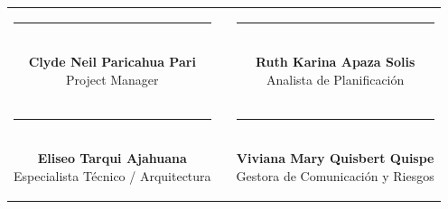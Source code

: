 \documentclass[11pt,a4paper]{article}
\begin{document}
\begin{center}
\begin{tabular}{c c c}
    \parbox{6.5cm}{\centering \rule{6.0cm}{0.6pt}\\[5pt] \textbf{Clyde Neil Paricahua Pari}\\[2pt] {\footnotesize Project Manager}} 
    & \hspace{0.8cm} &
    \parbox{6.5cm}{\centering \rule{6.0cm}{0.6pt}\\[5pt] \textbf{Ruth Karina Apaza Solis}\\[2pt] {\footnotesize Analista de Planificación}} 
    \\[2.2cm]
    \parbox{6.5cm}{\centering \rule{6.0cm}{0.6pt}\\[5pt] \textbf{Eliseo Tarqui Ajahuana}\\[2pt] {\footnotesize Especialista Técnico / Arquitectura}} 
    & \hspace{0.8cm} &
    \parbox{6.5cm}{\centering \rule{6.0cm}{0.6pt}\\[5pt] \textbf{Viviana Mary Quisbert Quispe}\\[2pt] {\footnotesize Gestora de Comunicación y Riesgos}}
\end{tabular}
\end{center}
\end{document}
